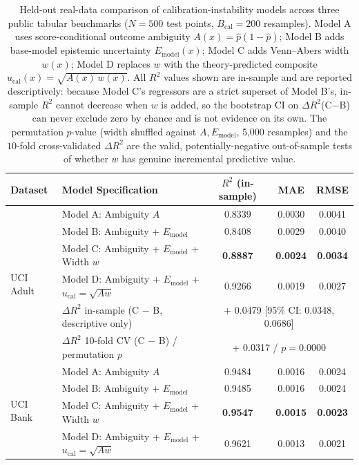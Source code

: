 \begin{table}[htbp]
\centering
\small
\caption{Held-out real-data comparison of calibration-instability models across three public tabular benchmarks ($N=500$ test points, $B_{\mathrm{cal}}=200$ resamples). Model A uses score-conditional outcome ambiguity $A(x)=\hat p(1-\hat p)$; Model B adds base-model epistemic uncertainty $E_{\mathrm{model}}(x)$; Model C adds Venn--Abers width $w(x)$; Model D replaces $w$ with the theory-predicted composite $u_{\mathrm{cal}}(x)=\sqrt{A(x)\,w(x)}$. All $R^2$ values shown are in-sample and are reported descriptively: because Model C's regressors are a strict superset of Model B's, in-sample $R^2$ cannot decrease when $w$ is added, so the bootstrap CI on $\Delta R^2$(C$-$B) can never exclude zero by chance and is not evidence on its own. The permutation $p$-value (width shuffled against $A, E_{\mathrm{model}}$, 5,000 resamples) and the $10$-fold cross-validated $\Delta R^2$ are the valid, potentially-negative out-of-sample tests of whether $w$ has genuine incremental predictive value.}
\label{tab:real_data_nested}
\begin{tabular}{llccc}
\toprule
Dataset & Model Specification & $R^2$ (in-sample) & MAE & RMSE \\
\midrule
\multirow{6}{*}{UCI Adult} & Model A: Ambiguity $A$ & 0.8339 & 0.0030 & 0.0041 \\
 & Model B: Ambiguity + $E_{\mathrm{model}}$ & 0.8408 & 0.0029 & 0.0040 \\
 & Model C: Ambiguity + $E_{\mathrm{model}}$ + Width $w$ & \textbf{0.8887} & \textbf{0.0024} & \textbf{0.0034} \\
 & Model D: Ambiguity + $E_{\mathrm{model}}$ + $u_{\mathrm{cal}}=\sqrt{Aw}$ & 0.9266 & 0.0019 & 0.0027 \\
 & $\Delta R^2$ in-sample (C $-$ B, descriptive only) & \multicolumn{3}{c}{+ 0.0479 [95\% CI: 0.0348, 0.0686]} \\
 & $\Delta R^2$ 10-fold CV (C $-$ B) / permutation $p$ & \multicolumn{3}{c}{+ 0.0317 / $p=0.0000$} \\
\midrule
\multirow{6}{*}{UCI Bank} & Model A: Ambiguity $A$ & 0.9484 & 0.0016 & 0.0024 \\
 & Model B: Ambiguity + $E_{\mathrm{model}}$ & 0.9485 & 0.0016 & 0.0024 \\
 & Model C: Ambiguity + $E_{\mathrm{model}}$ + Width $w$ & \textbf{0.9547} & \textbf{0.0015} & \textbf{0.0023} \\
 & Model D: Ambiguity + $E_{\mathrm{model}}$ + $u_{\mathrm{cal}}=\sqrt{Aw}$ & 0.9621 & 0.0013 & 0.0021 \\

\end{tabular}
\end{table}

